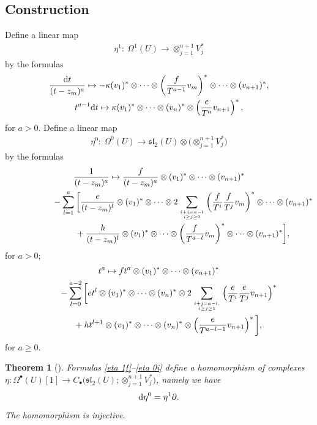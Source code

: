 \documentclass[pdftex]{sigma}
\numberwithin{equation}{section}
\newtheorem{thm}{Theorem}[section]
\begin{document}
\subsection{Construction}\label{sec constr}
Define a linear map
\begin{gather*}
\eta^1\colon \ \Omega^1(U)\longrightarrow \otimes_{j=1}^{n+1} V_j^*
\end{gather*}
by the formulas
\begin{gather}
\frac{{\rm d}t}{(t-z_m)^{a}} \mapsto -\kappa (v_1)^*\otimes\dots\otimes \left(\frac{f}{T^{a-1}}v_m\right)^* \otimes\dots\otimes (v_{n+1})^*, \label{eta 1f} \\
t^{a-1}{\rm d}t \mapsto \kappa (v_1)^*\otimes\dots\otimes (v_n)^* \otimes \left(\frac{e}{T^{a}}v_{n+1}\right)^*, \label{eta 1i}
\end{gather}
for $a> 0$. Define a linear map
\begin{gather*}
\eta^0\colon \ \Omega^0(U)\longrightarrow \mathfrak{sl}_2(U)\otimes \big({\otimes}_{j=1}^{n+1} V_j^*\big)
\end{gather*}
by the formulas
\begin{gather}
\frac{1}{(t-z_m)^a} \mapsto \frac{f}{(t-z_m)^a}\otimes (v_1)^*\otimes\dots\otimes (v_{n+1})^*\nonumber\\
\hphantom{\frac{1}{(t-z_m)^a} \mapsto}{} -\sum_{l=1}^a\bigg[\frac{e}{(t-z_m)^l}\otimes (v_1)^*\otimes \dots\otimes 2\sum_{i+j=a-l \atop i\geq j\geq 0} \left(\frac{f}{T^i}\frac{f}{T^j}v_m\right)^*\otimes\dots\otimes (v_{n+1})^* \nonumber \\
\hphantom{\frac{1}{(t-z_m)^a} \mapsto}{} {} +\frac{h}{(t-z_m)^l}\otimes (v_1)^*\otimes \dots\otimes \left(\frac{f}{T^{a-l}}v_m\right)^*\otimes \dots\otimes (v_{n+1})^* \bigg],\label{eta 0f}
\end{gather}
for $a>0$;
\begin{gather}
t^a \mapsto ft^a\otimes (v_1)^*\otimes\dots\otimes (v_{n+1})^*\nonumber \\
\hphantom{t^a \mapsto}{} - \sum_{l=0}^{a-2}\bigg[et^l\otimes (v_1)^*\otimes\dots\otimes
(v_n)^*\otimes 2\sum_{i+j=a-l,\atop i\geq j\geq 1} \left(\frac{e}{T^i} \frac{e}{T^j}v_{n+1}\right)^* \nonumber \\
\hphantom{t^a \mapsto}{} + ht^{l+1}\otimes (v_1)^*\otimes\dots\otimes (v_n)^*\otimes \left(\frac{e}{T^{a-l-1}}v_{n+1}\right)^* \bigg],\label{eta 0i}
\end{gather}
for $a\geq 0$.

\begin{thm}[{\cite[Theorem 5.12]{SV2}}]\label{thm hom} Formulas \eqref{eta 1f}--\eqref{eta 0i} define a homomorphism of complexes $\eta\colon \Omega^{\bullet}(U)[1] \to C_{\bullet}\big(\mathfrak{sl}_2(U);\otimes_{j=1}^{n+1} V_j^*\big)$, namely we have
\begin{gather*}%
{\rm d} \eta^0 = \eta^1\partial.
\end{gather*}
The homomorphism is injective.
\end{thm}
\end{document}
